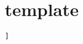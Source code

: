 \chapter{template}
\label{app:template}

\begin{lstlisting}[language=JavaScript, caption={The server app code}, label={lst:Server}]]



\end{lstlisting}